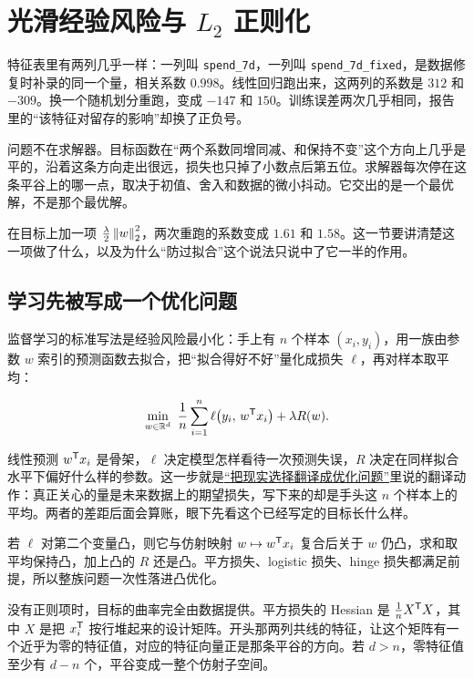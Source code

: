 \section{\texorpdfstring{光滑经验风险与 \(L_2\) 正则化}{光滑经验风险与 L2 正则化}}
\label{sec:09-Convex-Optimization/07-Applications/01}

特征表里有两列几乎一样：一列叫 \texttt{spend\_7d}，一列叫 \texttt{spend\_7d\_fixed}，是数据修复时补录的同一个量，相关系数 \(0.998\)。线性回归跑出来，这两列的系数是 \(312\) 和 \(-309\)。换一个随机划分重跑，变成 \(-147\) 和 \(150\)。训练误差两次几乎相同，报告里的``该特征对留存的影响''却换了正负号。

问题不在求解器。目标函数在``两个系数同增同减、和保持不变''这个方向上几乎是平的，沿着这条方向走出很远，损失也只掉了小数点后第五位。求解器每次停在这条平谷上的哪一点，取决于初值、舍入和数据的微小抖动。它交出的是一个最优解，不是那个最优解。

在目标上加一项 \(\frac{\lambda}{2}\left\lVert w\right\rVert_2^2\)，两次重跑的系数变成 \(1.61\) 和 \(1.58\)。这一节要讲清楚这一项做了什么，以及为什么``防过拟合''这个说法只说中了它一半的作用。

\subsection{学习先被写成一个优化问题}

监督学习的标准写法是经验风险最小化：手上有 \(n\) 个样本 \((x_i,y_i)\)，用一族由参数 \(w\) 索引的预测函数去拟合，把``拟合得好不好''量化成损失 \(\ell\)，再对样本取平均：

\[
\min_{w\in\R^d}\ \frac1n\sum_{i=1}^n\ell\bigl(y_i,\,w^{\trans}x_i\bigr)+\lambda R(w).
\]

线性预测 \(w^{\mathsf{T}}x_i\) 是骨架，\(\ell\) 决定模型怎样看待一次预测失误，\(R\) 决定在同样拟合水平下偏好什么样的参数。这一步就是\hyperref[sec:09-Convex-Optimization/01-Optimization-Foundations/01]{``把现实选择翻译成优化问题''}里说的翻译动作：真正关心的量是未来数据上的期望损失，写下来的却是手头这 \(n\) 个样本上的平均。两者的差距后面会算账，眼下先看这个已经写定的目标长什么样。

若 \(\ell\) 对第二个变量凸，则它与仿射映射 \(w\mapsto w^{\mathsf{T}}x_i\) 复合后关于 \(w\) 仍凸，求和取平均保持凸，加上凸的 \(R\) 还是凸。平方损失、logistic 损失、hinge 损失都满足前提，所以整族问题一次性落进凸优化。

没有正则项时，目标的曲率完全由数据提供。平方损失的 Hessian 是 \(\frac1nX^{\mathsf{T}}X\)，其中 \(X\) 是把 \(x_i^{\mathsf{T}}\) 按行堆起来的设计矩阵。开头那两列共线的特征，让这个矩阵有一个近乎为零的特征值，对应的特征向量正是那条平谷的方向。若 \(d>n\)，零特征值至少有 \(d-n\) 个，平谷变成一整个仿射子空间。

